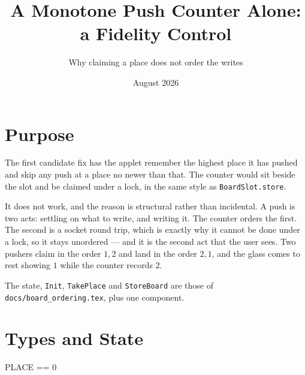 \documentclass[a4paper,10pt,fleqn]{article}
\begin{document}
\title{A Monotone Push Counter Alone: a Fidelity Control}
\author{Why claiming a place does not order the writes}
\date{August 2026}
\maketitle

\section{Purpose}

The first candidate fix has the applet remember the highest place it has
pushed and skip any push at a place no newer than that. The counter would sit
beside the slot and be claimed under a lock, in the same style as
\texttt{BoardSlot.store}.

It does not work, and the reason is structural rather than incidental. A push
is two acts: settling on what to write, and writing it. The counter orders the
first. The second is a socket round trip, which is exactly why it cannot be
done under a lock, so it stays unordered --- and it is the second act that the
user sees. Two pushers claim in the order $1, 2$ and land in the order $2, 1$,
and the glass comes to rest showing $1$ while the counter records $2$.

The state, \texttt{Init}, \texttt{TakePlace} and \texttt{StoreBoard} are those
of \texttt{docs/board\_ordering.tex}, plus one component.

\section{Types and State}

\begin{zed}
  [WORKER]
\end{zed}

\begin{zed}
  PLACE == 0 
\end{zed}
\end{document}
